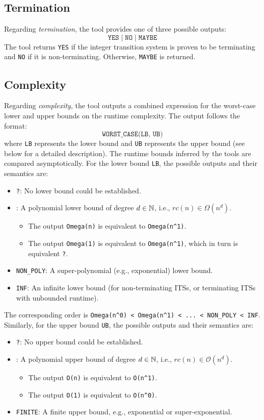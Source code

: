 \subsection{Termination}
%
Regarding \emph{termination}, the tool provides one of three possible outputs:
\[
  \texttt{YES} \mid \texttt{NO} \mid \texttt{MAYBE}
\]
The tool returns \texttt{YES} if the integer transition system is proven to be terminating and \texttt{NO} if it is non-terminating.
%
Otherwise, \texttt{MAYBE} is returned.
%
\subsection{Complexity}
%
Regarding \emph{complexity}, the tool outputs a combined expression for the worst-case lower and upper bounds on the runtime complexity.
%
The output follows the format:
\[
  \texttt{WORST\_CASE(LB, UB)}
\]
where \texttt{LB} represents the lower bound and \texttt{UB} represents the upper bound (see below for a detailed description).
%
The runtime bounds inferred by the tools are compared asymptotically.
%
For the lower bound \texttt{LB}, the possible outputs and their semantics are:
\begin{itemize}
    \item \texttt{?}: No lower bound could be established.
    \item {}: A polynomial lower bound of degree $d \in \mathbb{N}$, i.e., $rc(n) \in \Omega(n^d)$.
      \begin{itemize}
      \item The output \texttt{Omega(n)} is equivalent to \texttt{Omega(n\textasciicircum 1)}.
      \item The output \texttt{Omega(1)} is equivalent to \texttt{Omega(n\textasciicircum 1)}, which in turn is equivalent \texttt{?}.
      \end{itemize}
    \item \texttt{NON\_POLY}: A super-polynomial (e.g., exponential) lower bound.
    \item \texttt{INF}: An infinite lower bound (for non-terminating ITSs, or terminating ITSs with unbounded runtime).
\end{itemize}
%
The corresponding order is \texttt{Omega(n\textasciicircum 0) < Omega(n\textasciicircum 1) < ... < NON\_POLY < INF}.
%
Similarly, for the upper bound \texttt{UB}, the possible outputs and their semantics are:
\begin{itemize}
    \item \texttt{?}: No upper bound could be established.
    \item {}: A polynomial upper bound of degree $d \in \mathbb{N}$, i.e., $rc(n) \in \mathcal{O}(n^d)$.
      \begin{itemize}
      \item The output \texttt{O(n)} is equivalent to \texttt{O(n\textasciicircum 1)}.
      \item The output \texttt{O(1)} is equivalent to \texttt{O(n\textasciicircum 0)}.
      \end{itemize}
    \item \texttt{FINITE}: A finite upper bound, e.g., exponential or super-exponential.
\end{itemize}
